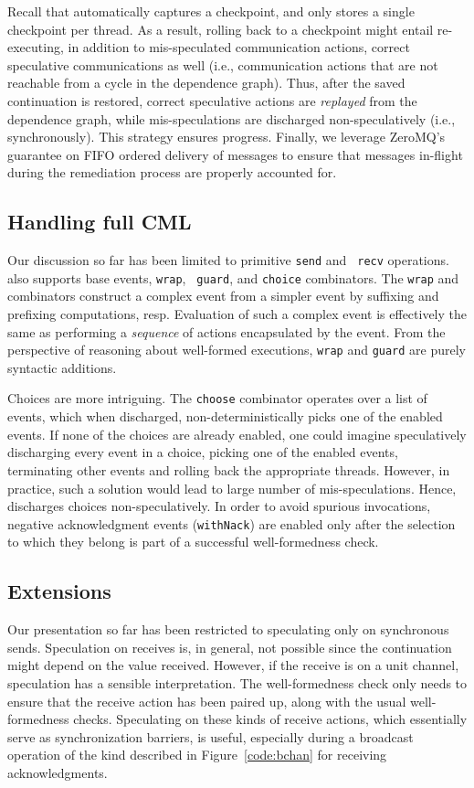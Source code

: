 Recall that \rxcml automatically captures a checkpoint, and only stores a
single checkpoint per thread. As a result, rolling back to a checkpoint
might entail re-executing, in addition to mis-speculated communication
actions, correct speculative communications as well (i.e., communication
actions that are not reachable from a cycle in the dependence graph).  Thus,
after the saved continuation is restored, correct speculative actions are
\emph{replayed} from the dependence graph, while mis-speculations are
discharged non-speculatively (i.e., synchronously). This strategy ensures
progress. Finally, we leverage ZeroMQ's guarantee on FIFO ordered delivery of
messages to ensure that messages in-flight during the remediation process are
properly accounted for.

\subsection{Handling full CML}

Our discussion so far has been limited to primitive {\tt send} and {\tt
recv} operations. \rxcml also supports base events, {\tt wrap}, {\tt
guard}, and {\tt choice} combinators.  The {\tt wrap} and 
combinators construct a complex event from a simpler event by suffixing and
prefixing computations, resp.  Evaluation of such a complex event is
effectively the same as performing a \emph{sequence} of actions encapsulated
by the event.  From the perspective of reasoning about well-formed
executions, {\tt wrap} and {\tt guard} are purely syntactic additions.

Choices are more intriguing. The {\tt choose} combinator operates over a list
of events, which when discharged, non-deterministically picks one of the
enabled events. If none of the choices are already enabled, one could imagine
speculatively discharging every event in a choice, picking one of the enabled
events, terminating other events and rolling back the appropriate threads.
However, in practice, such a solution would lead to large number of
mis-speculations. Hence, \rxcml discharges choices non-speculatively. In order
to avoid spurious invocations, negative acknowledgment events ({\tt withNack})
are enabled only after the selection to which they belong is part of a
successful well-formedness check.

\subsection{Extensions}
Our presentation so far has been restricted to speculating only on synchronous
sends. Speculation on receives is, in general, not possible since the
continuation might depend on the value received. However, if the receive is on
a unit channel, speculation has a sensible interpretation. The well-formedness
check only needs to ensure that the receive action has been paired up, along
with the usual well-formedness checks. Speculating on these kinds of receive
actions, which essentially serve as synchronization barriers, is useful,
especially during a broadcast operation of the kind described in
Figure~\ref{code:bchan} for receiving acknowledgments.

